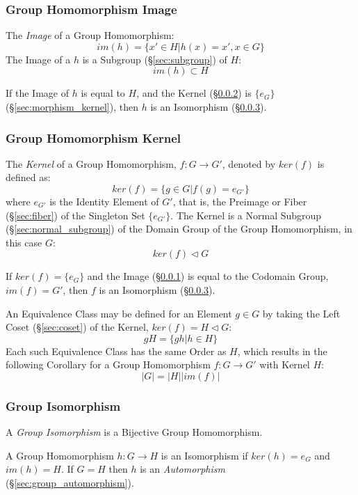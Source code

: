 \subsubsection{Group Homomorphism Image}\label{sec:group_image}

The \emph{Image} of a Group Homomorphism:
\[
    im(h) = \{ x' \in H | h(x) = x', x \in G \}
\]
The Image of a $h$ is a Subgroup (\S\ref{sec:subgroup}) of $H$:
\[
    im(h) \subset H
\]

If the Image of $h$ is equal to $H$, and the Kernel
(\S\ref{sec:group_kernel}) is $\{e_G\}$ (\S\ref{sec:morphism_kernel}),
then $h$ is an Isomorphism (\S\ref{sec:group_isomorphism}).



\subsubsection{Group Homomorphism Kernel}\label{sec:group_kernel}

The \emph{Kernel} of a Group Homomorphism, $f : G \rightarrow G'$,
denoted by $ker(f)$ is defined as:
\[
    ker(f) = \{g \in G | f(g) = e_{G'}\}
\]
where $e_{G'}$ is the Identity Element of $G'$, that is, the Preimage
or Fiber (\S\ref{sec:fiber}) of the Singleton Set $\{e_{G'}\}$. The
Kernel is a Normal Subgroup (\S\ref{sec:normal_subgroup}) of the
Domain Group of the Group Homomorphism, in this case $G$:
\[
    ker(f) \triangleleft G
\]

If $ker(f) = \{e_G\}$ and the Image (\S\ref{sec:group_image}) is equal
to the Codomain Group, $im(f) = G'$, then $f$ is an Isomorphism
(\S\ref{sec:group_isomorphism}).

An Equivalence Class may be defined for an Element $g \in G$ by taking
the Left Coset (\S\ref{sec:coset}) of the Kernel, $ker(f) = H
\triangleleft G$:
\[
    gH = \{ gh | h \in H \}
\]
Each such Equivalence Class has the same Order as $H$, which results
in the following Corollary for a Group Homomorphism $f : G \rightarrow
G'$ with Kernel $H$:
\[
    |G| = |H||im(f)|
\]



\subsubsection{Group Isomorphism}\label{sec:group_isomorphism}

A \emph{Group Isomorphism} is a Bijective Group Homomorphism.

A Group Homomorphism $h : G \rightarrow H$ is an Isomorphism if
$ker(h) = e_G$ and $im(h) = H$. If $G = H$ then $h$ is an
\emph{Automorphism} (\S\ref{sec:group_automorphism}).

